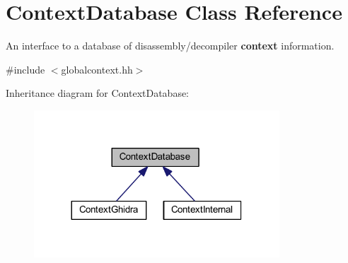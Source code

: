\hypertarget{class_context_database}{}\section{Context\+Database Class Reference}
\label{class_context_database}


An interface to a database of disassembly/decompiler {\bfseries{context}} information.  




{\ttfamily \#include $<$globalcontext.\+hh$>$}



Inheritance diagram for Context\+Database\+:
\nopagebreak
\begin{figure}[H]
\begin{center}
\leavevmode
\includegraphics[width=260pt]{class_context_database__inherit__graph}
\end{center}
\end{figure}
